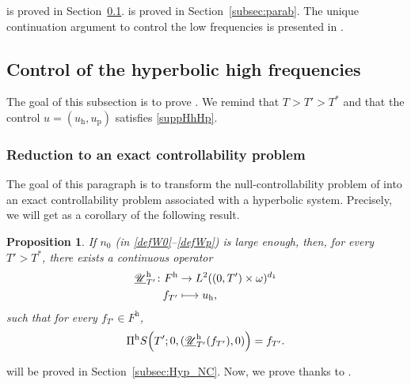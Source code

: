 \documentclass[10pt]{amsart}
\let\mathcal\mathscr
\def\mto{\mathchoice{\longmapsto}{\mapsto}{\mapsto}{\mapsto}}
\theoremstyle{plain}
\newtheorem{prop}[theorem]{Proposition}
\theoremstyle{definition}
\theoremstyle{remark}
\newcommand{\h}{{\mathrm h}}
\newcommand{\p}{{\mathrm p}}
\let\originalleft\left
\let\originalright\right
\renewcommand{\left}{\mathopen{}\mathclose\bgroup\originalleft}
\renewcommand{\right}{\aftergroup\egroup\originalright}
\begin{document}
 is proved in Section~\ref{subsec:hyp}.
 is proved in Section~\ref{subsec:parab}.
The unique continuation argument to control the low frequencies is presented in .

\subsection{Control of the hyperbolic high frequencies} \label{subsec:hyp}
The goal of this subsection is to prove . We remind that $T > T' >T^\ast$ and that the control $u = (u_\h,u_\p)$ satisfies \eqref{suppHhHp}.

\subsubsection{Reduction to an exact controllability problem}
\label{SecReduceHyp}

The goal of this paragraph is to transform the null-controllability problem of  into an exact controllability problem associated with a hyperbolic system. Precisely, we will get  as a corollary of the following result.

\begin{prop} \label{LemHyp_BIS}
If $n_0$ (in \eqref{defW0}--\eqref{defWp}) is large enough, then, for every ${T'}>T^*$, there exists a continuous operator
\begin{align*}
\underline{\mathcal U}_{T'}^\h \colon
F^{\h} & \to L^2((0,T')\times\omega)^{d_1}\\
f_{T'} &\mto u_{\h},
\end{align*}
such that for every $f_{T'} \in F^{\h}$,
\begin{equation*}
\Pi^{\h} S \left({T'}; 0, (\underline{\mathcal U}_{T'}^\h(f_{T'}),0) \right) = f_{T'}.
\end{equation*}
\end{prop}

 will be proved in Section~\ref{subsec:Hyp_NC}. Now, we prove  thanks to .
\end{document}

